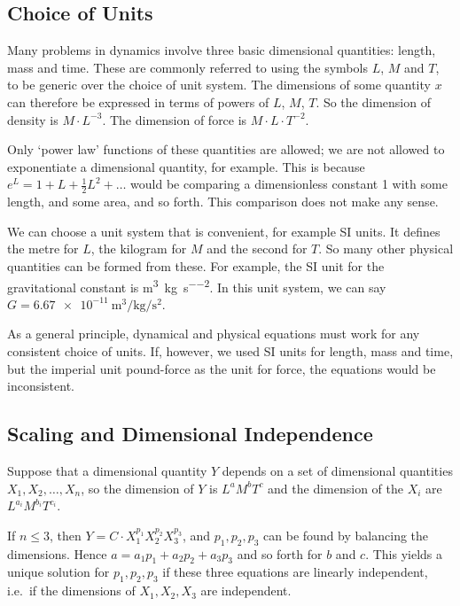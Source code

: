 \subsection{Choice of Units}
Many problems in dynamics involve three basic dimensional quantities: length, mass and time.
These are commonly referred to using the symbols \(L\), \(M\) and \(T\), to be generic over the choice of unit system.
The dimensions of some quantity \(x\) can therefore be expressed in terms of powers of \(L\), \(M\), \(T\).
So the dimension of density is \(M \cdot L^{-3}\).
The dimension of force is \(M \cdot L \cdot T^{-2}\).

Only `power law' functions of these quantities are allowed; we are not allowed to exponentiate a dimensional quantity, for example.
This is because \(e^L = 1 + L + \frac{1}{2}L^2 + \dots\) would be comparing a dimensionless constant 1 with some length, and some area, and so forth.
This comparison does not make any sense.

We can choose a unit system that is convenient, for example SI units.
It defines the metre for \(L\), the kilogram for \(M\) and the second for \(T\).
So many other physical quantities can be formed from these.
For example, the SI unit for the gravitational constant is \si{\metre\cubed\per\kilogram\per\second\squared}.
In this unit system, we can say \(G = \SI{6.67e-11}{\metre\cubed\per\kilogram\per\second\squared}\).

As a general principle, dynamical and physical equations must work for any consistent choice of units.
If, however, we used SI units for length, mass and time, but the imperial unit pound-force as the unit for force, the equations would be inconsistent.

\subsection{Scaling and Dimensional Independence}
Suppose that a dimensional quantity \(Y\) depends on a set of dimensional quantities \(X_1, X_2, \dots, X_n\), so the dimension of \(Y\) is \(L^a M^b T^c\) and the dimension of the \(X_i\) are \(L^{a_i} M^{b_i} T^{c_i}\).

If \(n \leq 3\), then \(Y = C \cdot X_1^{p_1}X_2^{p_2}X_3^{p_3}\), and \(p_1, p_2, p_3\) can be found by balancing the dimensions.
Hence \(a = a_1p_1 + a_2p_2 + a_3p_3\) and so forth for \(b\) and \(c\).
This yields a unique solution for \(p_1, p_2, p_3\) if these three equations are linearly independent, i.e.\ if the dimensions of \(X_1, X_2, X_3\) are independent.

